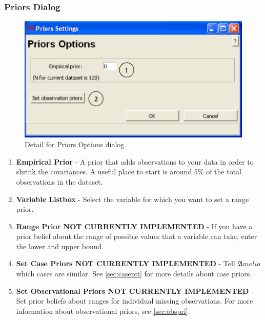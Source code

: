 \documentclass[12pt,titlepage]{article}
\begin{document}
\subsubsection{Priors Dialog}
\label{sec:pridiag}
\begin{figure}[ht]
  \centering \includegraphics[scale=.75]{priors}
  \caption{Detail for Priors Options dialog.}
\end{figure}
\begin{enumerate}
\item \textbf{Empirical Prior} - A prior that adds observations to
  your data in order to shrink the covariances.  A useful place to
  start is around 5\% of the total observations in the dataset.
\item \textbf{Variable Listbox} - Select the variable for which you
  want to set a range prior.
\item \textbf{Range Prior \textbf{NOT CURRENTLY IMPLEMENTED}} - If you
  have a prior belief about the range of possible values that a
  variable can take, enter the lower and upper bound.
\item \textbf{Set Case Priors \textbf{NOT CURRENTLY IMPLEMENTED}} -
  Tell ${\mathfrak Amelia}$ which cases are similar.  See
  \ref{sec:casepri} for more details about case priors.
\item \textbf{Set Observational Priors \textbf{NOT CURRENTLY
      IMPLEMENTED}} - Set prior beliefs about ranges for individual
  missing observations.  For more information about observational
  priors, see \ref{sec:obspri}.
\end{enumerate}
\end{document}
